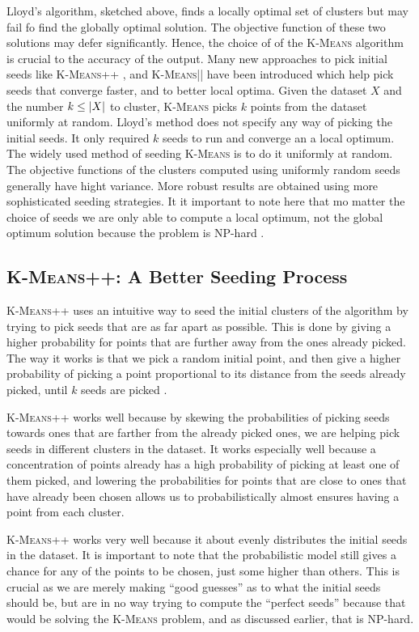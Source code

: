\documentclass[12pt]{dalthesis}
\newcommand*{\kmeansn}{\textsc{K-Means}} %
\newcommand*{\kmeans}{\textsc{K-Means} } %
\DeclarePairedDelimiter\abs{\lvert}{\rvert}
\begin{document}
Lloyd's algorithm, sketched above, finds a locally optimal set of clusters but may fail fo find the globally optimal solution. The objective function of these two solutions may defer significantly. Hence, the choice of of the \kmeans algorithm is crucial to the accuracy of the output.
Many new approaches to pick initial seeds like \kmeansn++ \citep{arthur2007k}, and \kmeansn|| \citep{bahmani2012scalable} have been introduced which help pick seeds that converge faster, and to better local optima. Given the dataset $X$ and the number $k\leq \abs{X}$ to cluster, \kmeans picks $k$ points from the dataset uniformly at random. Lloyd's method does not specify any way of picking the initial seeds. It only required $k$ seeds to run and converge an a local optimum. The widely used method of seeding \kmeans  is to do it uniformly at random. The objective functions of the clusters computed using uniformly random seeds generally have hight variance. More robust results are obtained using more sophisticated seeding strategies. It it important to note here that mo matter the choice of seeds we are only able to compute a local optimum, not the global optimum solution because the problem is NP-hard \citep{mahajan2009planar}. 

\subsection{\kmeansn++: A Better Seeding Process}
\kmeansn++ uses an intuitive way to seed the initial clusters of the algorithm by trying to pick seeds that are as far apart as possible. This is done by giving a higher probability for points that are further away from the ones already picked. The way it works is that we pick a random initial point, and then give a higher probability of picking a point proportional to its distance from the seeds already picked, until $k$ seeds are picked \citep{arthur2007k}.

\kmeansn++ works well because by skewing the probabilities of picking seeds towards ones that are farther from the already picked ones, we are helping pick seeds in different clusters in the dataset. It works especially well because a concentration of points already has a high probability of picking at least one of them picked, and lowering the probabilities for points that are close to ones that have already been chosen allows us to probabilistically almost ensures having a point from each cluster.

\kmeansn++ works very well because it about evenly distributes the initial seeds in the dataset. It is important to note that the probabilistic model still gives a chance for any of the points to be chosen, just some higher than others. This is crucial as we are merely making ``good guesses'' as to what the initial seeds should be, but are in no way trying to compute the ``perfect seeds'' because that would be solving the \kmeans problem, and as discussed earlier, that is NP-hard.
\end{document}
